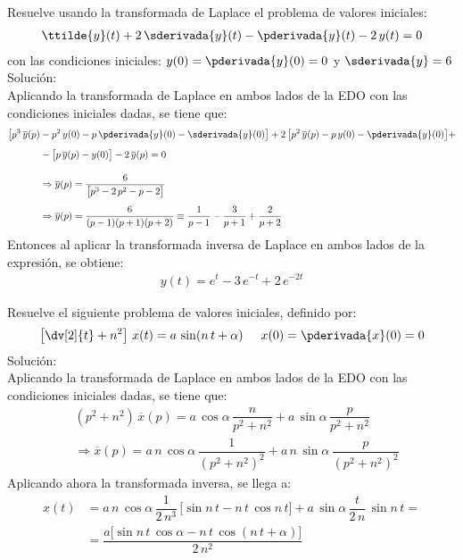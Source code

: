 \begin{ejemplo}
Resuelve usando la transformada de Laplace el problema de valores iniciales:
\begin{align*}
\ttilde{y}(t) +  2 \, \sderivada{y} (t) - \pderivada{y}(t) - 2 \, y(t) = 0
\end{align*}
con las condiciones iniciales: $y(0) = \pderivada{y}(0) = 0$ y $\sderivada{y} = 6$
\noindent Solución:
\\[0.5em]
Aplicando la transformada de Laplace en ambos lados de la EDO con las condiciones iniciales dadas, se tiene que:
\begin{align*}
\big[ p^{3} \, \overline{y}(p) &- p^{2} \, y(0) - p \, \pderivada{y}(0) - \sderivada{y}(0)  \big] + 2 \, \big[ p^{2} \, \overline{y}(p) - p \, y(0) - \pderivada{y}(0)  \big] + \\[0.5em]
&- \big[ p \, \overline{y}(p) - y(0)  \big] - 2 \, \overline{y}(p) = 0 \\[1em]
&\Rightarrow \overline{y}(p) = \dfrac{6}{\big[ p^{3} - 2 \, p^{2} - p -2  \big]} \\[0.5em]
&\Rightarrow \overline{y}(p) = \dfrac{6}{(p - 1)(p + 1)(p +2)} \equiv \dfrac{1}{p - 1} - \dfrac{3}{p + 1} + \dfrac{2}{p + 2}  
\end{align*}
Entonces al aplicar la transformada inversa de Laplace en ambos lados de la expresión, se obtiene:
\begin{align*}
y(t) = e^{t} - 3 \, e^{-t} + 2 \, e^{- 2 t}
\end{align*}
\end{ejemplo}
\begin{ejemplo}
Resuelve el siguiente problema de valores iniciales, definido por:
\begin{align*}
\left[ \dv[2]{t} + n^{2}\right] \, x(t) = a \, \sin (n \, t +  \alpha) \hspace{0.5cm} x(0) = \pderivada{x}(0) = 0
\end{align*}
\noindent Solución:
\\[0.5em]
Aplicando la transformada de Laplace en ambos lados de la EDO con las condiciones iniciales dadas, se tiene que:
\begin{align*}
&(p^{2} + n^{2}) \, \overline{x}(p) = a \, \cos \alpha \, \dfrac{n}{p^{2} + n^{2}} +  a \, \sin \alpha \, \dfrac{p}{p^{2} + n^{2}} \\[0.5em]
&\Rightarrow \overline{x}(p) = a \, n \, \cos \alpha \, \dfrac{1}{(p^{2} + n^{2})^{2}} + a \, n \, \sin \alpha \, \dfrac{p}{(p^{2} + n^{2})^{2}}
\end{align*}
Aplicando ahora la transformada inversa, se llega a:
\begin{align*}
x(t) &= a \, n \, \cos \alpha \, \dfrac{1}{2 \, n^{3}} \, \big[ \sin n \, t - n \, t \, \cos n \, t  \big] + a \, \sin \alpha \, \dfrac{t}{2 \, n} \, \sin n \, t = \\[0.5em]
&= \dfrac{a \big[ \sin n \, t \, \cos \alpha - n \, t \, \cos (n \, t +  \alpha)]}{2 \, n^{2}}
\end{align*}
\end{ejemplo}
